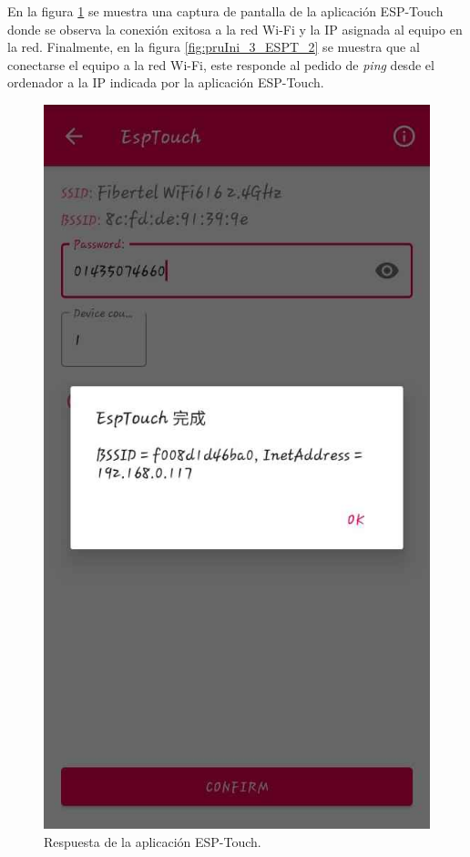 En la figura \ref{fig:pruIni_3_ESPT_1} se muestra una captura de pantalla de la aplicación ESP-Touch donde se observa la conexión exitosa a la red Wi-Fi y la IP asignada al equipo en la red. Finalmente, en la figura \ref{fig:pruIni_3_ESPT_2} se muestra que al conectarse el equipo a la red Wi-Fi, este responde al pedido de \textit{ping} desde el ordenador a la IP indicada por la aplicación ESP-Touch.

\pagebreak

\begin{figure}[htpb]
	\centering
	\includegraphics[scale=0.4]{./Figures/ESP_Touch_ok.jpeg}
	\caption{Respuesta de la aplicación ESP-Touch.}
	\label{fig:pruIni_3_ESPT_1}
\end{figure}

